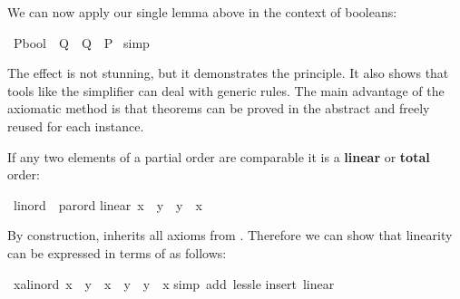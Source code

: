 \begin{isabellebody}
\begin{isamarkuptext}
We can now apply our single lemma above in the context of booleans:%
\end{isamarkuptext}%
\isamarkuptrue%
\isamarkupfalse%
\ {\isachardoublequoteopen}{\isacharparenleft}P{\isacharcolon}{\isacharcolon}bool{\isacharparenright}\ {\isacharless}{\isacharless}\ Q\ {\isasymLongrightarrow}\ {\isasymnot}{\isacharparenleft}Q\ {\isacharless}{\isacharless}\ P{\isacharparenright}{\isachardoublequoteclose}\isanewline
%
\isadelimproof
%
\endisadelimproof
%
\isatagproof
{}\isamarkupfalse%
\ simp%
\endisatagproof
{\isafoldproof}%
%
\isadelimproof
%
\endisadelimproof
%
\begin{isamarkuptext}%
\noindent
The effect is not stunning, but it demonstrates the principle.  It also shows
that tools like the simplifier can deal with generic rules.
The main advantage of the axiomatic method is that
theorems can be proved in the abstract and freely reused for each instance.%
\end{isamarkuptext}%
\isamarkuptrue%
%
\isamarkuptrue%
%
\begin{isamarkuptext}%
If any two elements of a partial order are comparable it is a
\textbf{linear} or \textbf{total} order:%
\end{isamarkuptext}%
\isamarkuptrue%
\isamarkupfalse%
\ linord\ {\isacharless}\ parord\isanewline
linear{\isacharcolon}\ {\isachardoublequoteopen}x\ {\isacharless}{\isacharless}{\isacharequal}\ y\ {\isasymor}\ y\ {\isacharless}{\isacharless}{\isacharequal}\ x{\isachardoublequoteclose}%
\begin{isamarkuptext}%
\noindent
By construction,  inherits all axioms from .
Therefore we can show that linearity can be expressed in terms of \isa{{\isacharless}{\isacharless}}
as follows:%
\end{isamarkuptext}%
\isamarkuptrue%
\isamarkupfalse%
\ {\isachardoublequoteopen}{\isasymAnd}x{\isacharcolon}{\isacharcolon}{\isacharprime}a{\isacharcolon}{\isacharcolon}linord{\isachardot}\ x\ {\isacharless}{\isacharless}\ y\ {\isasymor}\ x\ {\isacharequal}\ y\ {\isasymor}\ y\ {\isacharless}{\isacharless}\ x{\isachardoublequoteclose}\isanewline
%
\isadelimproof
%
\endisadelimproof
%
\isatagproof
{}\isamarkupfalse%
{\isacharparenleft}simp\ add{\isacharcolon}\ less{\isacharunderscore}le{\isacharparenright}\isanewline
{}\isamarkupfalse%
{\isacharparenleft}insert\ linear{\isacharparenright}\isanewline
{}\isamarkupfalse%

\end{isabellebody}
